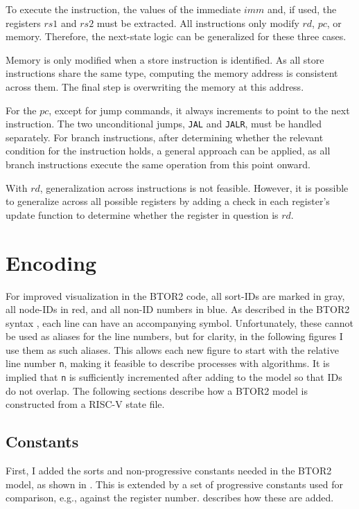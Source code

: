 To execute the instruction, the values of the immediate $imm$ and, if
used, the registers $rs1$ and $rs2$ must be extracted. All
instructions only modify $rd$, $pc$, or memory. Therefore, the
next-state logic can be generalized for these three cases.

Memory is only modified when a store instruction is identified. As
all store instructions share the same type, computing the memory
address is consistent across them. The final step is overwriting the
memory at this address.

For the $pc$, except for jump commands, it always increments to point
to the next instruction. The two unconditional jumps, \texttt{JAL}
and \texttt{JALR}, must be handled separately. For branch
instructions, after determining whether the relevant condition for
the instruction holds, a general approach can be applied, as all
branch instructions execute the same operation from this point
onward.

With $rd$, generalization across instructions is not feasible.
However, it is possible to generalize across all possible registers
by adding a check in each register's update function to determine
whether the register in question is $rd$.

\section{Encoding}
For improved visualization in the BTOR2 code, all sort-IDs are marked
in \textcolor{UniGrey}{gray}, all node-IDs in
\textcolor{UniRed}{red}, and all non-ID numbers in
\textcolor{UniBlue}{blue}. As described in the BTOR2 syntax
\cite[Figure 1]{btor2}, each line can have an accompanying symbol.
Unfortunately, these cannot be used as aliases for the line numbers,
but for clarity, in the following figures I use them as such aliases.
This allows each new figure to start with the relative line number
\texttt{n}, making it feasible to describe processes with algorithms.
It is implied that \texttt{n} is sufficiently incremented after
adding to the model so that IDs do not overlap. The following
sections describe how a BTOR2 model is constructed from a RISC-V
state file.

\subsection{Constants}
First, I added the sorts and non-progressive constants needed in the
BTOR2 model, as shown in . This is extended by
a set of progressive constants used for comparison, e.g., against the
register number.  describes how these
are added.

